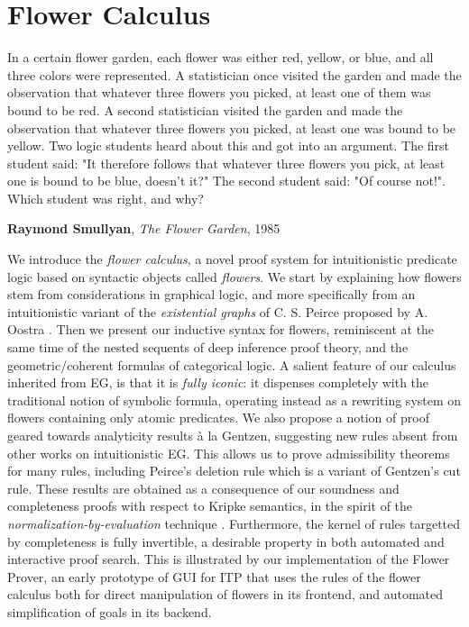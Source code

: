 \setchapterpreamble[u]{\margintoc}
\chapter{Flower Calculus}

\epigraph{In a certain flower garden, each flower was either red, yellow, or
blue, and all three colors were represented. A statistician once visited the
garden and made the observation that whatever three flowers you picked, at least
one of them was bound to be red. A second statistician visited the garden and
made the observation that whatever three flowers you picked, at least one was
bound to be yellow. Two logic students heard about this and got into an
argument. The first student said: "It therefore follows that whatever three
flowers you pick, at least one is bound to be blue, doesn't it?" The second
student said: "Of course not!". Which student was right, and why?
}{\textbf{Raymond Smullyan}, \textit{The Flower Garden}, 1985}

We introduce the \emph{flower calculus}, a novel proof system for intuitionistic
predicate logic based on syntactic objects called \emph{flowers}. We start by
explaining how flowers stem from considerations in graphical logic, and more
specifically from an intuitionistic variant of the \emph{existential graphs} of
C. S. Peirce proposed by A. Oostra . Then
we present our inductive syntax for flowers, reminiscent at the same time of the
nested sequents of deep inference proof theory, and the geometric/coherent
formulas of categorical logic. A salient feature of our calculus inherited from
EG, is that it is \emph{fully iconic}: it dispenses completely with the
traditional notion of symbolic formula, operating instead as a rewriting system
on flowers containing only atomic predicates. We also propose a notion of proof
geared towards analyticity results à la Gentzen, suggesting new rules absent
from other works on intuitionistic EG. This allows us to prove admissibility
theorems for many rules, including Peirce's deletion rule which is a variant of
Gentzen's cut rule. These results are obtained as a consequence of our soundness
and completeness proofs with respect to Kripke semantics, in the spirit of the
\emph{normalization-by-evaluation} technique . Furthermore, the
kernel of rules targetted by completeness is fully invertible, a desirable
property in both automated and interactive proof search. This is illustrated by
our implementation of the Flower Prover, an early prototype of GUI for ITP that
uses the rules of the flower calculus both for direct manipulation of flowers in
its frontend, and automated simplification of goals in its backend.

